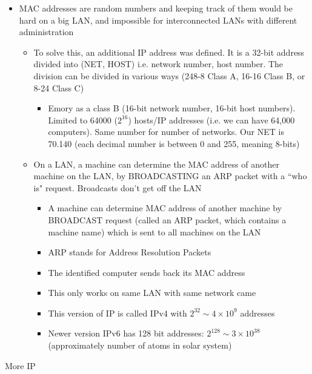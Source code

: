 \begin{itemize}
    \item MAC addresses are random numbers and keeping track of them would be hard on a big LAN, and impossible for interconnected LANs with different administration
    \begin{itemize}
        \item To solve this, an additional IP address was defined. It is a 32-bit address divided into (NET, HOST) i.e. network number, host number. The division can be divided in various ways (248-8 Class A, 16-16 Class B, or 8-24 Class C)
        \begin{itemize}
            \item Emory as a class B (16-bit network number, 16-bit host numbers). Limited to 64000 ($2^16$) hosts/IP addresses (i.e. we can have 64,000 computers). Same number for number of networks. Our NET is 70.140 (each decimal number is between 0 and 255, meaning 8-bits)
        \end{itemize}
        \item On a LAN, a machine can determine the MAC address of another machine on the LAN, by BROADCASTING an ARP packet with a ``who is" request. Broadcasts don't get off the LAN
        \begin{itemize}
            \item A machine can determine MAC address of another machine by BROADCAST request (called an ARP packet, which contains a machine name) which is sent to all machines on the LAN
            \item ARP stands for Address Resolution Packets
            \item The identified computer sends back its MAC address
            \item This only works on same LAN with same network came
            \item This version of IP is called IPv4 with $2^{32} \sim 4\times 10^9$ addresses
            \item Newer version IPv6 has 128 bit addresses: $2^{128} \sim 3\times 10^{38}$ (approximately number of atoms in solar system)
        \end{itemize}
    \end{itemize}
\end{itemize}
More IP

